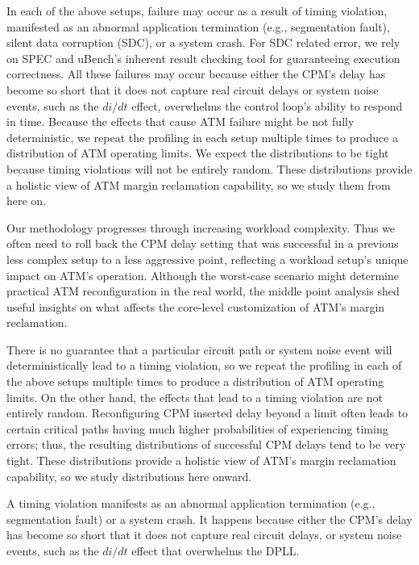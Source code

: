 In each of the above setups, failure may occur as a result of timing violation, manifested as an abnormal application termination (e.g., segmentation fault), silent data corruption (SDC), or a system crash. For SDC related error, we rely on SPEC and uBench's inherent result checking tool for guaranteeing execution correctness. All these failures may occur because either the CPM's delay has become so short that it does not capture real circuit delays or system noise events, such as the $di/dt$ effect, overwhelms the control loop's ability to respond in time. Because the effects that cause ATM failure might be not fully deterministic, we repeat the profiling in each setup multiple times to produce a distribution of ATM operating limits. We expect the distributions to be tight because timing violations will not be entirely random. These distributions provide a holistic view of ATM margin reclamation capability, so we study them from here on.

Our methodology progresses through increasing workload complexity. Thus we often need to roll back the CPM delay setting that was successful in a previous less complex setup to a less aggressive point, reflecting a workload setup's unique impact on ATM's operation. Although the worst-case scenario might determine practical ATM reconfiguration in the real world, the middle point analysis shed useful insights on what affects the core-level customization of ATM's margin reclamation.

There is no guarantee that a particular circuit path or system noise event will deterministically lead to a timing violation, so we repeat the profiling in each of the above setups multiple times to produce a distribution of ATM operating limits. On the other hand, the effects that lead to a timing violation are not entirely random. Reconfiguring CPM inserted delay beyond a limit often leads to certain critical paths having much higher probabilities of experiencing timing errors; thus, the resulting distributions of successful CPM delays tend to be very tight. These distributions provide a holistic view of ATM's margin reclamation capability, so we study distributions here onward.

A timing violation manifests as an abnormal application termination (e.g., segmentation fault) or a system crash. It happens because either the CPM's delay has become so short that it does not capture real circuit delays, or system noise events, such as the $di/dt$ effect that overwhelms the DPLL.

